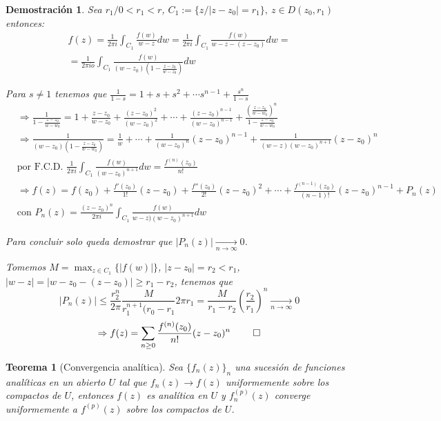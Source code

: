 \documentclass[10pt]{book}
\newtheorem{theorem}{Teorema}[chapter]
\newtheorem*{dem}{Demostración}
\begin{document}
\begin{dem}
Sea $r_1 /  0<r_1<r$, $C_1 := \{z/|z-z_0|=r_1\},\ z\in D(z_0,r_1)$ entonces:
\begin{multline*}
f(z) = \frac{1}{2\pi i} \int_{C_1}\frac{f(w)}{w-z}dw = \frac{1}{2\pi i}\int_{C_1} \frac{f(w)}{w-z-(z-z_0)}dw =\\
= \frac{1}{2\pi io} \int_{C_1} \frac{f(w)}{(w-z_0)\left(1-\frac{z-z_0}{w-z_0}\right)}dw
\end{multline*}

Para $s\neq 1$ tenemos que $\frac{1}{1-s} = 1 +s+s^2+\cdots s^{n-1} +\frac{s^n}{1-s}$
\begin{align*}
&\Rightarrow \frac{1}{1-\frac{z-z_0}{w-w_0}} = 1 + \frac{z-z_0}{w-z_0} +\frac{(z-z_0)^2}{(w-z_0)^2} +\cdots + \frac{(z-z_0)^{n-1}}{(w-z_0)^{n-1}} + \frac{\left(\frac{z-z_0}{w-w_0}\right)^n}{1-\frac{z-z_0}{w-w_0}}\\
&\Rightarrow \frac{1}{(w-z_0)\left(1-\frac{z-z_0}{w-w_0}\right)} = \frac{1}{w} +  \cdots + \frac{1}{(w-z_0)^n}(z-z_0)^{n-1} + \frac{1}{(w-z)(w-z_0)^{n+1}}(z-z_0)^n\\
&\text{por F.C.D. } \frac{1}{2\pi i} \int_{C_1}\frac{f(w)}{(w-z_0)^{n+1}}dw = \frac{f^{(n)}(z_0)}{n!}\\
& \Rightarrow f(z) = f(z_0) + \frac{f'(z_0)}{1!}(z-z_0) +\frac{f''(z_0)}{2!}(z-z_0)^2+ \cdots + \frac{f^{(n-1)}(z_0)}{(n-1)!}(z-z_0)^{n-1} + P_n(z)\\
& \text{con } P_n(z) = \frac{(z-z_0)^n}{2\pi i}\int_{C_1} \frac{f(w)}{w-z)(w-z_0)^{n+1}}dw
\end{align*}

Para concluir solo queda demostrar que $|P_n(z)| \xrightarrow[n\to \infty]{}0$.

Tomemos $M = \max_{z\in C_1}\{|f(w)|\}$, $|z-z_0| = r_2 < r_1$, $|w-z| = |w-z_0-(z-z_0)| \geq r_1-r_2$, tenemos que
$$|P_n(z)| \leq \frac{r_2^n}{2\pi}\frac{M}{r_1^{n+1}(r_0-r_1}2\pi r_1 = \frac{M}{r_1-r_2}\left(\frac{r_2}{r_1}\right)^n \xrightarrow[n\to \infty]{}0$$
$$\Rightarrow f(z) = \sum_{n\geq 0} \frac{f^{(n)}(z_0)}{n!}(z-z_0)^n\ \qed$$ 
\end{dem}


\begin{theorem}[Convergencia analítica]
Sea $\{f_n(z)\}_n$ una sucesión de funciones analíticas en un abierto $U$ tal que $f_n(z) \to f(z)$ uniformemente sobre los compactos  de $U$, entonces $f(z)$ es analítica en $U$ y $f_n^{(p)}(z)$ converge uniformemente a $f^{(p)}(z)$ sobre los compactos de $U$.
\end{theorem}
\end{document}
